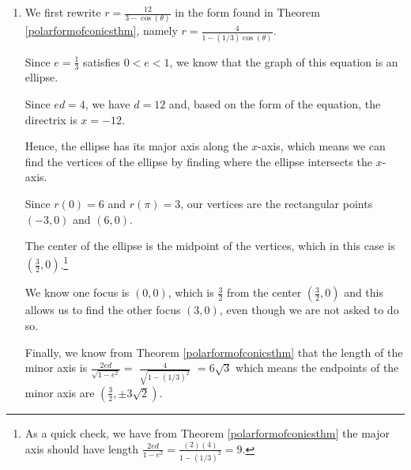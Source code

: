 \documentclass{ximera}
\begin{document}
\begin{example}
\begin{explanation}
\begin{enumerate}
\begin{image}
\end{image}


\item  We first rewrite $r = \frac{12}{3 - \cos(\theta)}$ in the form found in Theorem \ref{polarformofconicsthm}, namely $r = \frac{4}{1 - (1/3) \cos(\theta)}$.  

 

Since $e = \frac{1}{3}$ satisfies $0 < e < 1$, we know that the graph of this equation is an ellipse.  

 

Since $ed= 4$, we have $d = 12$ and, based on the form of the equation, the directrix is $x = -12$.  

 

Hence,  the ellipse has its major axis along the $x$-axis, which means we can find the vertices of the ellipse by finding where the ellipse intersects the $x$-axis.   

 

Since  $r(0) = 6$ and $r(\pi) = 3$,  our vertices are the rectangular points  $(-3,0)$ and $(6,0)$.  

 

The center of the ellipse is the midpoint of the vertices,  which in this case is $\left(\frac{3}{2}, 0\right)$.\footnote{As a quick check, we have from Theorem \ref{polarformofconicsthm} the major axis should have length $\frac{2ed}{1-e^2} = \frac{(2)(4)}{1-(1/3)^2} = 9$.}  

 

We know one focus is $(0,0)$, which is $\frac{3}{2}$ from the center $\left(\frac{3}{2}, 0\right)$ and this allows us to find the other focus $(3, 0)$, even though we are not asked to do so.  

 

Finally, we know from Theorem \ref{polarformofconicsthm} that the length of the minor axis is $\frac{2ed}{\sqrt{1-e^2}} =$ { $\frac{4}{\sqrt{1-(1/3)^2}}$} $= 6\sqrt{3}$ which means the endpoints of the minor axis are $\left(\frac{3}{2}, \pm 3\sqrt{2}\right)$. 


\end{enumerate}
\end{explanation}
\end{example}
\end{document}

